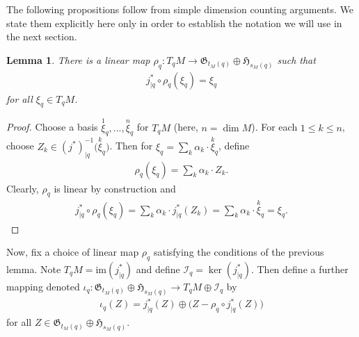 \documentclass[sn-mathphys,Numbered]{sn-jnl}
\newtheorem{proposition}[theorem]{Proposition}%
\newtheorem{lemma}[theorem]{Lemma}%
\begin{document}
The following propositions follow from simple dimension counting arguments. 
 We state them explicitly here only in order to establish the notation we will use in the next section.\bigskip

\begin{lemma}
    There is a linear map $\rho_q: T_qM\to \mathfrak{G}_{t_M(q)}\oplus\mathfrak{H}_{s_M(q)}$ such that \begin{align}
        j^*_{|q}\circ\rho_q(\xi_q) = \xi_q
    \end{align}
    for all $\xi_q\in T_qM$.
\end{lemma}

\begin{proof}
    Choose a basis $\overset{1}{\xi}_q,...,\overset{n}{\xi}_q$ for $T_qM$ (here, $n = \dim M$).  For each $1\leq k\leq n$, choose $Z_k\in (j^*)_{|q}^{-1}\Big(\overset{k}{\xi}_q\Big)$.  Then for $\xi_q = \sum_k \alpha_k\cdot \overset{k}{\xi}_q$, define
    \begin{align}
        \rho_q(\xi_q) = \sum_k \alpha_k\cdot Z_k.
    \end{align}
    Clearly, $\rho_q$ is linear by construction and
    \begin{align}
        j^*_{|q}\circ\rho_q(\xi_q) = \sum_k\alpha_k\cdot j^*_{|q}(Z_k) = \sum_k\alpha_k\cdot \overset{k}{\xi}_q = \xi_q.
    \end{align}
\end{proof}

Now, fix a choice of linear map $\rho_q$ satisfying the conditions of the previous lemma.  Note $T_qM = \text{im}(j^*_{|q})$ and define $\mathcal{I}_q = \ker(j^*_{|q})$.  Then define a further mapping denoted $\iota_q: \mathfrak{G}_{t_M(q)}\oplus\mathfrak{H}_{s_M(q)}\to T_qM\oplus\mathcal{I}_q$ by
\begin{align}
    \iota_q(Z) = j^*_{|q}(Z)\oplus \big(Z-\rho_q\circ j^*_{|q}(Z)\big)
\end{align}
for all $Z\in \mathfrak{G}_{t_M(q)}\oplus\mathfrak{H}_{s_M(q)}.$\medskip
\end{document}
